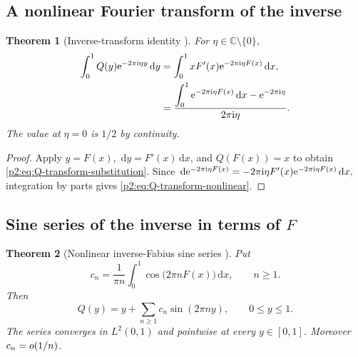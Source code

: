 \documentclass[11pt]{article}
\newtheorem{theorem}{Theorem}[section]
\theoremstyle{definition}
\theoremstyle{remark}
\newcommand{\C}{\mathbb C}
\newcommand{\dd}{\,\mathrm d}
\begin{document}
\subsection{A nonlinear Fourier transform of the inverse}

\begin{theorem}[Inverse-transform identity \New]
For $\eta\in\C\setminus\{0\}$,
\begin{align}
 \int_0^1Q(y)\e^{-2\pi\ii\eta y}\dd y
 &=\int_0^1xF'(x)\e^{-2\pi\ii\eta F(x)}\dd x,            \label{p2:eq:Q-transform-substitution}\\
 &=\frac{\displaystyle\int_0^1\e^{-2\pi\ii\eta F(x)}\dd x
       -\e^{-2\pi\ii\eta}}
 {2\pi\ii\eta}.                                        \label{p2:eq:Q-transform-nonlinear}
\end{align}
The value at $\eta=0$ is $1/2$ by continuity.
\end{theorem}

\begin{proof}
Apply $y=F(x)$, $\dd y=F'(x)\dd x$, and $Q(F(x))=x$ to obtain
\eqref{p2:eq:Q-transform-substitution}.  Since
\(
 \dd\e^{-2\pi\ii\eta F(x)}
 =-2\pi\ii\eta F'(x)\e^{-2\pi\ii\eta F(x)}\dd x,
\)
integration by parts gives \eqref{p2:eq:Q-transform-nonlinear}.
\end{proof}

\subsection{Sine series of the inverse in terms of \texorpdfstring{$F$}{F}}

\begin{theorem}[Nonlinear inverse-Fabius sine series \New]
Put
\begin{equation}
 c_n=\frac{1}{\pi n}\int_0^1\cos\bigl(2\pi nF(x)\bigr)\dd x,
 \qquad n\ge1.                                           \label{p2:eq:Q-sine-coeff}
\end{equation}
Then
\begin{equation}
 \boxed{\quad
 Q(y)=y+\sum_{n\ge1}c_n\sin(2\pi ny),
 \qquad 0\le y\le1.
 \quad}                                                  \label{p2:eq:Q-sine-series}
\end{equation}
The series converges in $L^2(0,1)$ and pointwise at every $y\in[0,1]$.  Moreover
$c_n=o(1/n)$.
\end{theorem}
\end{document}
